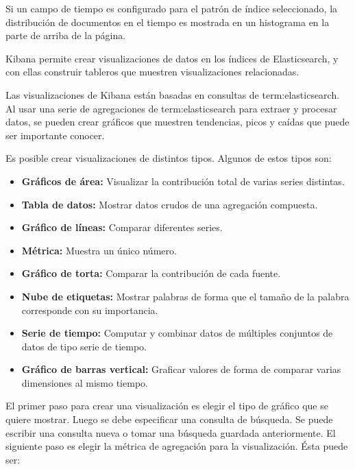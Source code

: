 Si un campo de tiempo es configurado para el patrón de índice seleccionado, la distribución de documentos en el tiempo es mostrada en un histograma en la parte de arriba de la página.

Kibana permite crear visualizaciones de datos en los índices de Elasticsearch, y con ellas construir tableros que muestren visualizaciones relacionadas.

Las visualizaciones de Kibana están basadas en consultas de \gls{term:elasticsearch}. Al usar una serie de agregaciones de \gls{term:elasticsearch} para extraer y procesar datos, se pueden crear gráficos que muestren tendencias, picos y caídas que puede ser importante conocer.

Es posible crear visualizaciones de distintos tipos. Algunos de estos tipos son:


\begin{itemize}

  \item \textbf{Gráficos de área:}
  Visualizar la contribución total de varias series distintas.

  \item \textbf{Tabla de datos:}
  Mostrar datos crudos de una agregación compuesta.

  \item \textbf{Gráfico de líneas:}
  Comparar diferentes series.

  \item \textbf{Métrica:}
  Muestra un único número.

  \item \textbf{Gráfico de torta:}
  Comparar la contribución de cada fuente.

  \item \textbf{Nube de etiquetas:}
  Mostrar palabras de forma que el tamaño de la palabra corresponde con su importancia.

  \item \textbf{Serie de tiempo:}
  Computar y combinar datos de múltiples conjuntos de datos de tipo serie de tiempo.

  \item \textbf{Gráfico de barras vertical:}
  Graficar valores de forma de comparar varias dimensiones al mismo tiempo.

\end{itemize}


El primer paso para crear una visualización es elegir el tipo de gráfico que se quiere mostrar. Luego se debe especificar una consulta de búsqueda. Se puede escribir una consulta nueva o tomar una búsqueda guardada anteriormente. El siguiente paso es elegir la métrica de agregación para la visualización. Ésta puede ser:

